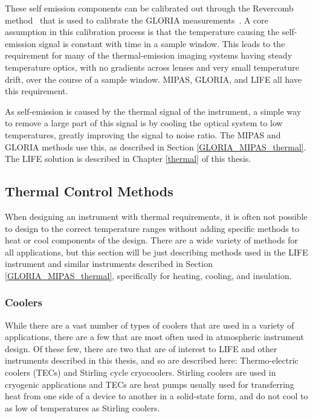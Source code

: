 These self emission components can be calibrated out through the Revercomb method~\citep{Revercomb_method} that is used to calibrate the GLORIA measurements~\citep{gloria_self_emission}. A core assumption in this calibration process is that the temperature causing the self-emission signal is constant with time in a sample window. This leads to the requirement for many of the thermal-emission imaging systems having steady temperature optics, with no gradients across lenses and very small temperature drift, over the course of a sample window. MIPAS, GLORIA, and LIFE all have this requirement.

As self-emission is caused by the thermal signal of the instrument, a simple way to remove a large part of this signal is by cooling the optical system to low temperatures, greatly improving the signal to noise ratio. The MIPAS and GLORIA methods use this, as described in Section \ref{GLORIA_MIPAS_thermal}. The LIFE solution is described in Chapter \ref{thermal} of this thesis.

\subsection{Thermal Control Methods} \label{Thermal_methods} %
When designing an instrument with thermal requirements, it is often not possible to design to the correct temperature ranges without adding specific methods to heat or cool components of the design. There are a wide variety of methods for all applications, but this section will be just describing methods used in the LIFE instrument and similar instruments described in Section \ref{GLORIA_MIPAS_thermal}, specifically for heating, cooling, and insulation.

\subsubsection{Coolers}

While there are a vast number of types of coolers that are used in a variety of applications, there are a few that are most often used in atmospheric instrument design. Of these few, there are two that are of interest to LIFE and other instruments described in this thesis, and so are described here: Thermo-electric coolers (TECs) and Stirling cycle cryocoolers. Stirling coolers are used in cryogenic applications and TECs are heat pumps usually used for transferring heat from one side of a device to another in a solid-state form, and do not cool to as low of temperatures as Stirling coolers.

